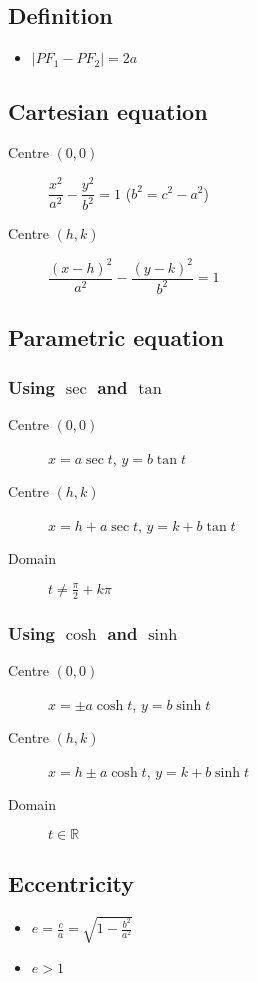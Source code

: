 \subsection{Definition}
\begin{itemize}
    \item $|PF_1 - PF_2| = 2a$
\end{itemize}
\subsection{Cartesian equation}
\begin{description}
    \item[Centre $(0,0)$] $\dfrac{x^2}{a^2}-\dfrac{y^2}{b^2}=1$ ($b^2=c^2-a^2$)
    \item[Centre $(h,k)$] $\dfrac{(x-h)^2}{a^2}-\dfrac{(y-k)^2}{b^2}=1$
\end{description}
\subsection{Parametric equation}
\subsubsection{Using $\sec$ and $\tan$}
\begin{description}
    \item[Centre $(0,0)$] $x=a\sec t$, $y=b\tan t$
    \item[Centre $(h,k)$] $x=h+a\sec t$, $y=k+b\tan t$
    \item[Domain] $t\neq \frac{\pi}{2}+k\pi$
\end{description}
\subsubsection{Using $\cosh$ and $\sinh$}

\begin{description}
    \item[Centre $(0,0)$] $x=\pm a\cosh t$, $y=b\sinh t$
    \item[Centre $(h,k)$] $x=h\pm a\cosh t$, $y=k+b\sinh t$
    \item[Domain] $t \in \mathbb{R}$
\end{description}
\subsection{Eccentricity}
\begin{itemize}
    \item $e=\frac{c}{a}=\sqrt{1-\frac{b^2}{a^2}}$
    \item $e>1$
\end{itemize}
